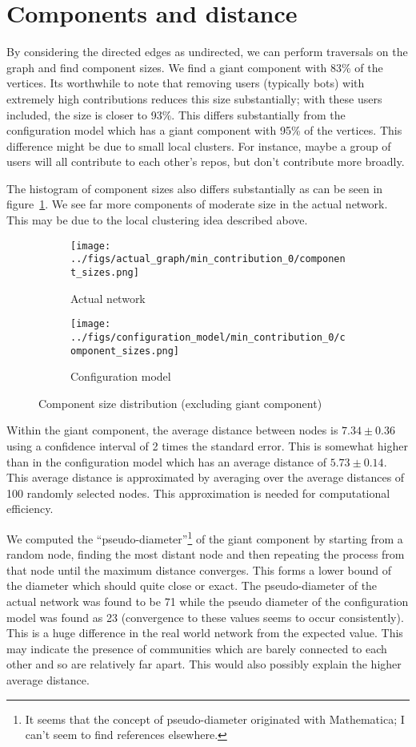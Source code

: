 \documentclass{pset}
\begin{document}
\section*{Components and distance}

By considering the directed edges as undirected, we can perform traversals
on the graph and find component sizes.
We find a giant component with 83\% of the vertices. 
Its worthwhile to note that removing users (typically bots) with extremely high
contributions reduces this size substantially; with these users included,
the size is closer to 93\%.
This differs substantially from
the configuration model which has a giant component with 95\% of the vertices.
This difference might be due to small local clusters. For instance, maybe a
group of users will all contribute to each other's repos, but don't contribute
more broadly. 

The histogram of component sizes also differs substantially
as can be seen in figure~\ref{fig:components hist}.
We see far more components of moderate size in the actual network.
This may be due to the local clustering idea described above.

\begin{figure}[ht]
\centering
\begin{subfigure}{.5\textwidth}
  \centering
  \texttt{[image: ../figs/actual\_graph/min\_contribution\_0/component\_sizes.png]}
    \caption{Actual network}
\end{subfigure}%
\begin{subfigure}{.5\textwidth}
  \centering
  \texttt{[image: ../figs/configuration\_model/min\_contribution\_0/component\_sizes.png]}
    \caption{Configuration model}
\end{subfigure}%
\caption{Component size distribution (excluding giant component)}\label{fig:components hist}
\end{figure}

Within the giant component, the average distance between nodes is $7.34 \pm 0.36$
using a confidence interval of 2 times the standard error.
This is somewhat higher than in the configuration model which has an average
distance of $5.73 \pm 0.14$. This average distance is approximated by averaging
over the average distances of 100 randomly selected nodes. This approximation
is needed for computational efficiency.

We computed the ``pseudo-diameter''\footnote{It seems that the concept of
pseudo-diameter originated with Mathematica; I can't seem to find references
elsewhere.} of the giant component by starting from a random node, finding the
most distant node and then repeating the process from that node until the
maximum distance converges. This forms a lower bound of the diameter which
should quite close or exact. The pseudo-diameter of the actual network was
found to be 71 while the pseudo diameter of the configuration model was found
as 23 (convergence to these values seems to occur consistently).  This is a
huge difference in the real world network from the expected value.  This may
indicate the presence of communities which are barely connected to each other
and so are relatively far apart. This would also possibly explain the higher
average distance.
\end{document}
